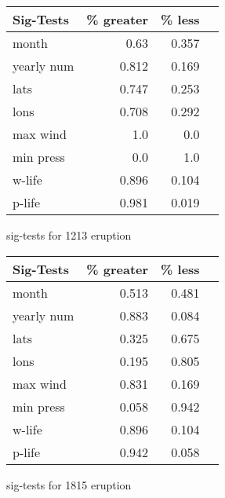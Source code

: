 \begin{figure}[!tbp]
\centering
\begin{minipage}[b]{0.45\textwidth}
\begin{tabular}{lrrr}
\toprule
             Sig-Tests & \% greater &  \% less \\

\midrule

month & 0.63 & 0.357 \\
yearly num & 0.812 & 0.169 \\
lats & 0.747 & 0.253 \\
lons & 0.708 & 0.292 \\
max wind & 1.0 & 0.0 \\
min press & 0.0 & 1.0 \\
w-life & 0.896 & 0.104 \\
p-life & 0.981 & 0.019 \\

\bottomrule
\end{tabular}
\caption{sig-tests for 1213 eruption}
\label{sig_1213}
\end{minipage}
\hfill
\begin{minipage}[b]{0.45\textwidth}
\begin{tabular}{lrrr}
\toprule
             Sig-Tests & \% greater &  \% less \\
\midrule

month & 0.513 & 0.481 \\
yearly num & 0.883 & 0.084 \\
lats & 0.325 & 0.675 \\
lons & 0.195 & 0.805 \\
max wind & 0.831 & 0.169 \\
min press & 0.058 & 0.942 \\
w-life & 0.896 & 0.104 \\
p-life & 0.942 & 0.058 \\

\bottomrule
\end{tabular}
\caption{sig-tests for 1815 eruption}
\label{sig_1815}
\end{minipage}
\end{figure}



